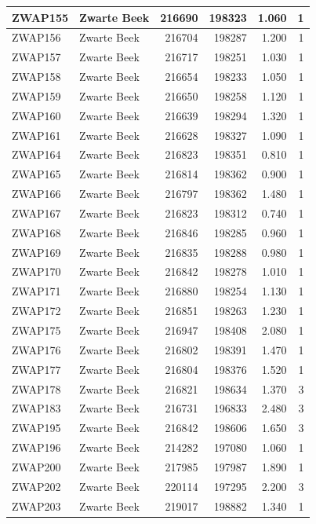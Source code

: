 \documentclass[11pt,]{book}
\begin{document}
\begin{table}
\begin{tabular}[t]{l|l|r|r|r|r}
\hline
ZWAP155 & Zwarte Beek & 216690 & 198323 & 1.060 & 1\\
\hline
ZWAP156 & Zwarte Beek & 216704 & 198287 & 1.200 & 1\\
\hline
ZWAP157 & Zwarte Beek & 216717 & 198251 & 1.030 & 1\\
\hline
ZWAP158 & Zwarte Beek & 216654 & 198233 & 1.050 & 1\\
\hline
ZWAP159 & Zwarte Beek & 216650 & 198258 & 1.120 & 1\\
\hline
ZWAP160 & Zwarte Beek & 216639 & 198294 & 1.320 & 1\\
\hline
ZWAP161 & Zwarte Beek & 216628 & 198327 & 1.090 & 1\\
\hline
ZWAP164 & Zwarte Beek & 216823 & 198351 & 0.810 & 1\\
\hline
ZWAP165 & Zwarte Beek & 216814 & 198362 & 0.900 & 1\\
\hline
ZWAP166 & Zwarte Beek & 216797 & 198362 & 1.480 & 1\\
\hline
ZWAP167 & Zwarte Beek & 216823 & 198312 & 0.740 & 1\\
\hline
ZWAP168 & Zwarte Beek & 216846 & 198285 & 0.960 & 1\\
\hline
ZWAP169 & Zwarte Beek & 216835 & 198288 & 0.980 & 1\\
\hline
ZWAP170 & Zwarte Beek & 216842 & 198278 & 1.010 & 1\\
\hline
ZWAP171 & Zwarte Beek & 216880 & 198254 & 1.130 & 1\\
\hline
ZWAP172 & Zwarte Beek & 216851 & 198263 & 1.230 & 1\\
\hline
ZWAP175 & Zwarte Beek & 216947 & 198408 & 2.080 & 1\\
\hline
ZWAP176 & Zwarte Beek & 216802 & 198391 & 1.470 & 1\\
\hline
ZWAP177 & Zwarte Beek & 216804 & 198376 & 1.520 & 1\\
\hline
ZWAP178 & Zwarte Beek & 216821 & 198634 & 1.370 & 3\\
\hline
ZWAP183 & Zwarte Beek & 216731 & 196833 & 2.480 & 3\\
\hline
ZWAP195 & Zwarte Beek & 216842 & 198606 & 1.650 & 3\\
\hline
ZWAP196 & Zwarte Beek & 214282 & 197080 & 1.060 & 1\\
\hline
ZWAP200 & Zwarte Beek & 217985 & 197987 & 1.890 & 1\\
\hline
ZWAP202 & Zwarte Beek & 220114 & 197295 & 2.200 & 3\\
\hline
ZWAP203 & Zwarte Beek & 219017 & 198882 & 1.340 & 1\\

\end{tabular}
\end{table}
\end{document}
